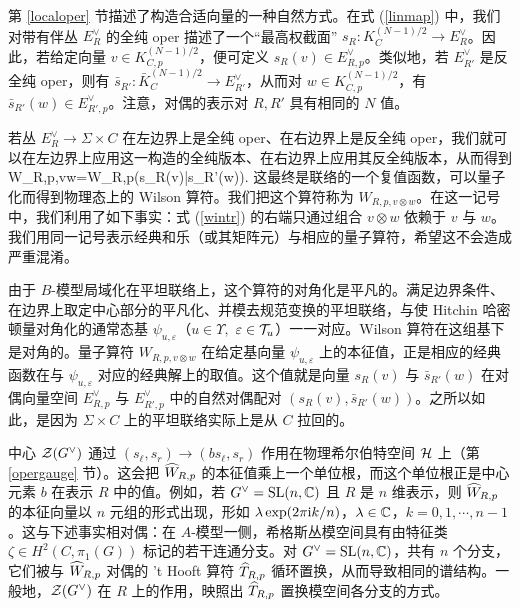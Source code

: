 第 \ref{localoper} 节描述了构造合适向量的一种自然方式。在式 (\ref{linmap}) 中，我们对带有伴丛 $E^\vee_R$ 的全纯 oper 描述了一个“最高权截面” $s_R:K_C^{(N-1)/2}\to E^\vee_R$。因此，若给定向量 $v\in K_{C,p}^{(N-1)/2}$，便可定义 $s_R(v)\in E^\vee_{R,p}$。类似地，若 $E^\vee_{R'}$ 是反全纯 oper，则有 $\bar s_{R'}:\bar K_C^{(N-1)/2}\to E^\vee_{R'}$，从而对 $w\in K_{C,p}^{(N-1)/2}$，有 $\bar s_{R'}(w)\in E^\vee_{R',p}$。注意，对偶的表示对 $R,R'$ 具有相同的 $N$ 值。

若丛 $E^\vee_R\to \Sigma\times C$ 在左边界上是全纯 oper、在右边界上是反全纯 oper，我们就可以在左边界上应用这一构造的全纯版本、在右边界上应用其反全纯版本，从而得到
\be\label{wintr}W_{R,p,v\otimes w}=W_{R,p}(s_{R}(v)\otimes \bar s_{R'}(w)). \ee
这最终是联络的一个复值函数，可以量子化而得到物理态上的 Wilson 算符。我们把这个算符称为 $W_{R,p,v\otimes w}$。在这一记号中，我们利用了如下事实：式 (\ref{wintr}) 的右端只通过组合 $v\otimes w$ 依赖于 $v$ 与 $w$。我们用同一记号表示经典和乐（或其矩阵元）与相应的量子算符，希望这不会造成严重混淆。

由于 $B$-模型局域化在平坦联络上，这个算符的对角化是平凡的。满足边界条件、在边界上取定中心部分的平凡化、并模去规范变换的平坦联络，与使 Hitchin 哈密顿量对角化的通常态基 $\psi_{u,\varepsilon}$（$u\in\Upsilon,$ $\varepsilon\in {\mathcal T}_u$）一一对应。Wilson 算符在这组基下是对角的。量子算符 $ W_{R,p,v\otimes w}$ 在给定基向量 $\psi_{u,\varepsilon}$ 上的本征值，正是相应的经典函数在与 $\psi_{u,\varepsilon}$ 对应的经典解上的取值。这个值就是向量 $s_{R}(v)$ 与 $\bar s_{R'}(w)$ 在对偶向量空间 $E^\vee_{R,p}$ 与 $E^\vee_{R',p}$ 中的自然对偶配对 $(s_R(v), \bar s_{R'}(w))$。之所以如此，是因为 $\Sigma\times C$ 上的平坦联络实际上是从 $C$ 拉回的。

中心 ${\mathcal Z}(G^\vee)$ 通过 $(s_\ell, s_r)\to (b s_\ell, s_r)$ 作用在物理希尔伯特空间 ${\mathcal H}$ 上（第 \ref{opergauge} 节）。这会把 $\widehat W_{R,p}$ 的本征值乘上一个单位根，而这个单位根正是中心元素 $b$ 在表示 $R$ 中的值。例如，若 $G^\vee={\mathrm{SL}}(n,{\mathbb C})$ 且 $R$ 是 $n$ 维表示，则 $\widehat W_{R,p}$ 的本征向量以 $n$ 元组的形式出现，形如 $\lambda\exp(2\pi {\mathrm i} k/n)$，$\lambda\in{\mathbb C}$，$k=0,1,\cdots, n-1$。这与下述事实相对偶：在 $A$-模型一侧，希格斯丛模空间具有由特征类 $\zeta\in H^2(C,\pi_1(G))$ 标记的若干连通分支。对 $G^\vee={\mathrm{SL}}(n,{\mathbb C})$，共有 $n$ 个分支，它们被与 $\widehat W_{R,p}$ 对偶的 't Hooft 算符 $\widehat T_{R,p}$ 循环置换，从而导致相同的谱结构。一般地，${\mathcal Z}(G^\vee)$ 在 $R$ 上的作用，映照出 $\widehat T_{R,p}$ 置换模空间各分支的方式。

